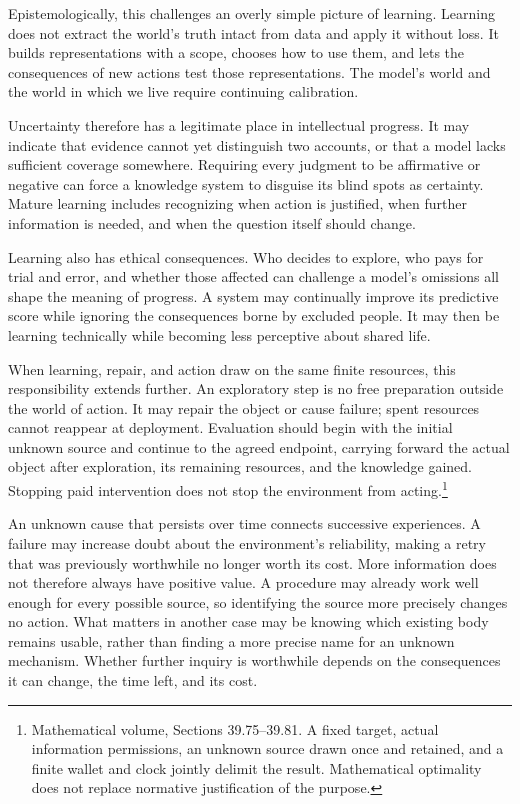 \documentclass[
  english,
  11pt,
  oneside]{book}
\begin{document}
Epistemologically, this challenges an overly simple picture of learning. Learning does not extract the world's truth intact from data and apply it without loss. It builds representations with a scope, chooses how to use them, and lets the consequences of new actions test those representations. The model's world and the world in which we live require continuing calibration.

Uncertainty therefore has a legitimate place in intellectual progress. It may indicate that evidence cannot yet distinguish two accounts, or that a model lacks sufficient coverage somewhere. Requiring every judgment to be affirmative or negative can force a knowledge system to disguise its blind spots as certainty. Mature learning includes recognizing when action is justified, when further information is needed, and when the question itself should change.

Learning also has ethical consequences. Who decides to explore, who pays for trial and error, and whether those affected can challenge a model's omissions all shape the meaning of progress. A system may continually improve its predictive score while ignoring the consequences borne by excluded people. It may then be learning technically while becoming less perceptive about shared life.

When learning, repair, and action draw on the same finite resources, this responsibility extends further. An exploratory step is no free preparation outside the world of action. It may repair the object or cause failure; spent resources cannot reappear at deployment. Evaluation should begin with the initial unknown source and continue to the agreed endpoint, carrying forward the actual object after exploration, its remaining resources, and the knowledge gained. Stopping paid intervention does not stop the environment from acting.\footnote{\hypertarget{ph-note-26}{}Mathematical volume, Sections 39.75--39.81. A fixed target, actual information permissions, an unknown source drawn once and retained, and a finite wallet and clock jointly delimit the result. Mathematical optimality does not replace normative justification of the purpose.}

An unknown cause that persists over time connects successive experiences. A failure may increase doubt about the environment's reliability, making a retry that was previously worthwhile no longer worth its cost. More information does not therefore always have positive value. A procedure may already work well enough for every possible source, so identifying the source more precisely changes no action. What matters in another case may be knowing which existing body remains usable, rather than finding a more precise name for an unknown mechanism. Whether further inquiry is worthwhile depends on the consequences it can change, the time left, and its cost.
\end{document}

